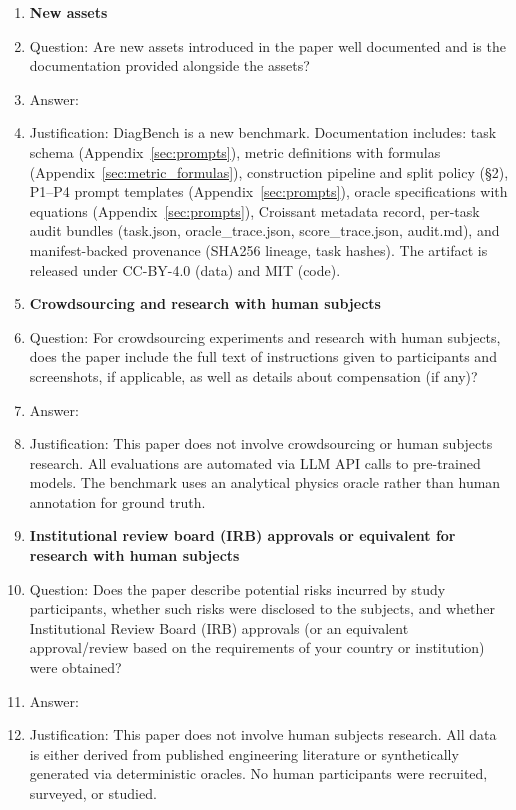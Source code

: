 \begin{enumerate}
\item {\bf New assets}
    \item[] Question: Are new assets introduced in the paper well documented and is the documentation provided alongside the assets?
    \item[] Answer: \answerYes{}
    \item[] Justification: DiagBench is a new benchmark. Documentation includes: task schema (Appendix~\ref{sec:prompts}), metric definitions with formulas (Appendix~\ref{sec:metric_formulas}), construction pipeline and split policy (§2), P1--P4 prompt templates (Appendix~\ref{sec:prompts}), oracle specifications with equations (Appendix~\ref{sec:prompts}), Croissant metadata record, per-task audit bundles (task.json, oracle\_trace.json, score\_trace.json, audit.md), and manifest-backed provenance (SHA256 lineage, task hashes). The artifact is released under CC-BY-4.0 (data) and MIT (code).

\item {\bf Crowdsourcing and research with human subjects}
    \item[] Question: For crowdsourcing experiments and research with human subjects, does the paper include the full text of instructions given to participants and screenshots, if applicable, as well as details about compensation (if any)?
    \item[] Answer: \answerNA{}
    \item[] Justification: This paper does not involve crowdsourcing or human subjects research. All evaluations are automated via LLM API calls to pre-trained models. The benchmark uses an analytical physics oracle rather than human annotation for ground truth.

\item {\bf Institutional review board (IRB) approvals or equivalent for research with human subjects}
    \item[] Question: Does the paper describe potential risks incurred by study participants, whether such risks were disclosed to the subjects, and whether Institutional Review Board (IRB) approvals (or an equivalent approval/review based on the requirements of your country or institution) were obtained?
    \item[] Answer: \answerNA{}
    \item[] Justification: This paper does not involve human subjects research. All data is either derived from published engineering literature or synthetically generated via deterministic oracles. No human participants were recruited, surveyed, or studied.


\end{enumerate}
